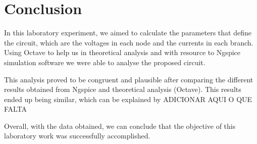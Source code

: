 \section{Conclusion}
\label{sec:conclusion}

In this laboratory experiment, we aimed to calculate the parameters that define the circuit, which are the voltages in each node and the currents in each branch.
Using Octave to help us in theoretical analysis and with resource to Ngspice simulation software we were able to analyse the proposed circuit.

This analysis proved to be congruent and plausible after comparing the different results obtained from Ngspice and theoretical analysis (Octave). This results ended up being similar, which can be explained by ADICIONAR AQUI O QUE FALTA

Overall, with the data obtained, we can conclude that the objective of this laboratory work was successfully accomplished.


